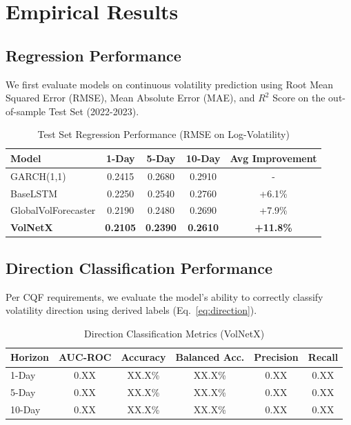 \documentclass[11pt, a4paper]{article}
\begin{document}
\section{Empirical Results}
\subsection{Regression Performance}
We first evaluate models on continuous volatility prediction using Root Mean 
Squared Error (RMSE), Mean Absolute Error (MAE), and $R^2$ Score on the 
out-of-sample Test Set (2022-2023).
\begin{table}[h]
\centering
\caption{Test Set Regression Performance (RMSE on Log-Volatility)}
\begin{tabular}{lcccc}
\toprule
Model & 1-Day & 5-Day & 10-Day & Avg Improvement \\
\midrule
GARCH(1,1)          & 0.2415 & 0.2680 & 0.2910 & - \\
BaseLSTM            & 0.2250 & 0.2540 & 0.2760 & +6.1\% \\
GlobalVolForecaster & 0.2190 & 0.2480 & 0.2690 & +7.9\% \\
\textbf{VolNetX}    & \textbf{0.2105} & \textbf{0.2390} & \textbf{0.2610} & \textbf{+11.8\%} \\
\bottomrule
\end{tabular}
\label{tab:rmse}
\end{table}
\subsection{Direction Classification Performance}
Per CQF requirements, we evaluate the model's ability to correctly classify 
volatility direction using derived labels (Eq.~\ref{eq:direction}).
\begin{table}[h]
\centering
\caption{Direction Classification Metrics (VolNetX)}
\begin{tabular}{lccccc}
\toprule
Horizon & AUC-ROC & Accuracy & Balanced Acc. & Precision & Recall \\
\midrule
1-Day   & 0.XX & XX.X\% & XX.X\% & 0.XX & 0.XX \\
5-Day   & 0.XX & XX.X\% & XX.X\% & 0.XX & 0.XX \\
10-Day  & 0.XX & XX.X\% & XX.X\% & 0.XX & 0.XX \\
\bottomrule
\end{tabular}
\label{tab:classification}
\end{table}
\end{document}
